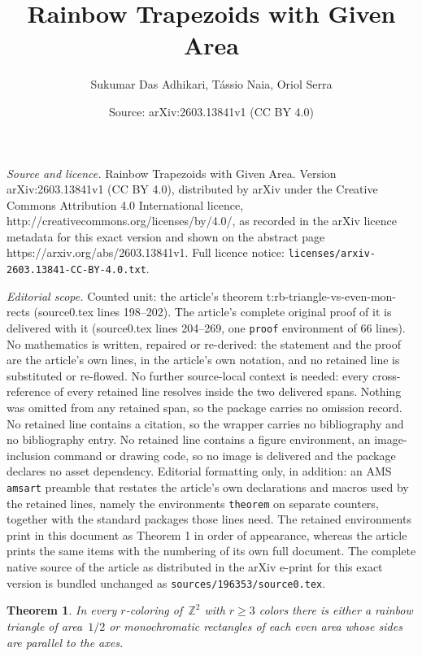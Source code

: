\documentclass[10pt,a4paper]{amsart}
\title{Rainbow Trapezoids with Given Area}
\author{Sukumar Das Adhikari, T\'assio Naia, Oriol Serra}
\date{Source: arXiv:2603.13841v1 (CC BY 4.0)}
\newtheorem{theorem}{Theorem}
\newcommand{\Z}{\mbox{${\mathbb Z}$}}
\begin{document}
\maketitle

\noindent\emph{Source and licence.} Rainbow Trapezoids with Given Area. Version arXiv:2603.13841v1 (CC BY 4.0), distributed by arXiv under the Creative Commons Attribution 4.0 International licence, http://creativecommons.org/licenses/by/4.0/, as recorded in the arXiv licence metadata for this exact version and shown on the abstract page https://arxiv.org/abs/2603.13841v1. Full licence notice: \texttt{licenses/arxiv-2603.13841-CC-BY-4.0.txt}.\par\smallskip

\noindent\textit{Editorial scope.} Counted unit: the article's theorem t:rb-triangle-vs-even-mon-rects (source0.tex lines 198--202). The article's complete original proof of it is delivered with it (source0.tex lines 204--269, one \texttt{proof} environment of 66 lines). No mathematics is written, repaired or re-derived: the statement and the proof are the article's own lines, in the article's own notation, and no retained line is substituted or re-flowed.  No further source-local context is needed: every cross-reference of every retained line resolves inside the two delivered spans.  Nothing was omitted from any retained span, so the package carries no omission record.  No retained line contains a citation, so the wrapper carries no bibliography and no bibliography entry.  No retained line contains a figure environment, an image-inclusion command or drawing code, so no image is delivered and the package declares no asset dependency.  Editorial formatting only, in addition: an AMS \texttt{amsart} preamble that restates the article's own declarations and macros used by the retained lines, namely the environments \texttt{theorem} on separate counters, together with the standard packages those lines need.  The retained environments print in this document as Theorem 1 in order of appearance, whereas the article prints the same items with the numbering of its own full document.  The complete native source of the article as distributed in the arXiv e-print for this exact version is bundled unchanged as \texttt{sources/196353/source0.tex}.
 \begin{theorem}\label{t:rb-triangle-vs-even-mon-rects}
      In every $r$-coloring of~$\Z^2$ with $r\ge 3$ colors there is either
      a rainbow triangle of area~$1/2$ or monochromatic rectangles
      of each even area whose sides are parallel to the axes.
    \end{theorem}
\end{document}
